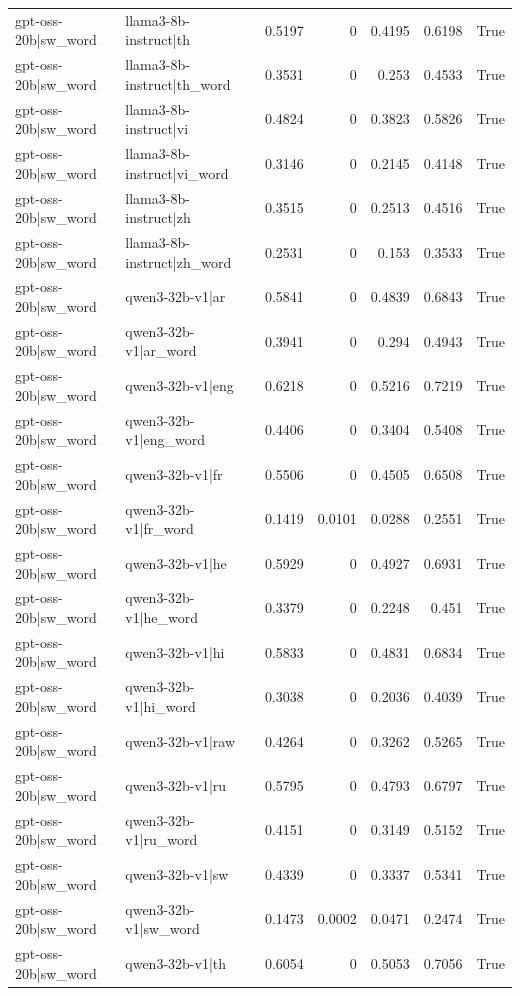 \begin{table}
\begin{tabular}{l l r r r r l}
gpt-oss-20b|sw_word & llama3-8b-instruct|th & 0.5197 & 0 & 0.4195 & 0.6198 & True \\
gpt-oss-20b|sw_word & llama3-8b-instruct|th_word & 0.3531 & 0 & 0.253 & 0.4533 & True \\
gpt-oss-20b|sw_word & llama3-8b-instruct|vi & 0.4824 & 0 & 0.3823 & 0.5826 & True \\
gpt-oss-20b|sw_word & llama3-8b-instruct|vi_word & 0.3146 & 0 & 0.2145 & 0.4148 & True \\
gpt-oss-20b|sw_word & llama3-8b-instruct|zh & 0.3515 & 0 & 0.2513 & 0.4516 & True \\
gpt-oss-20b|sw_word & llama3-8b-instruct|zh_word & 0.2531 & 0 & 0.153 & 0.3533 & True \\
gpt-oss-20b|sw_word & qwen3-32b-v1|ar & 0.5841 & 0 & 0.4839 & 0.6843 & True \\
gpt-oss-20b|sw_word & qwen3-32b-v1|ar_word & 0.3941 & 0 & 0.294 & 0.4943 & True \\
gpt-oss-20b|sw_word & qwen3-32b-v1|eng & 0.6218 & 0 & 0.5216 & 0.7219 & True \\
gpt-oss-20b|sw_word & qwen3-32b-v1|eng_word & 0.4406 & 0 & 0.3404 & 0.5408 & True \\
gpt-oss-20b|sw_word & qwen3-32b-v1|fr & 0.5506 & 0 & 0.4505 & 0.6508 & True \\
gpt-oss-20b|sw_word & qwen3-32b-v1|fr_word & 0.1419 & 0.0101 & 0.0288 & 0.2551 & True \\
gpt-oss-20b|sw_word & qwen3-32b-v1|he & 0.5929 & 0 & 0.4927 & 0.6931 & True \\
gpt-oss-20b|sw_word & qwen3-32b-v1|he_word & 0.3379 & 0 & 0.2248 & 0.451 & True \\
gpt-oss-20b|sw_word & qwen3-32b-v1|hi & 0.5833 & 0 & 0.4831 & 0.6834 & True \\
gpt-oss-20b|sw_word & qwen3-32b-v1|hi_word & 0.3038 & 0 & 0.2036 & 0.4039 & True \\
gpt-oss-20b|sw_word & qwen3-32b-v1|raw & 0.4264 & 0 & 0.3262 & 0.5265 & True \\
gpt-oss-20b|sw_word & qwen3-32b-v1|ru & 0.5795 & 0 & 0.4793 & 0.6797 & True \\
gpt-oss-20b|sw_word & qwen3-32b-v1|ru_word & 0.4151 & 0 & 0.3149 & 0.5152 & True \\
gpt-oss-20b|sw_word & qwen3-32b-v1|sw & 0.4339 & 0 & 0.3337 & 0.5341 & True \\
gpt-oss-20b|sw_word & qwen3-32b-v1|sw_word & 0.1473 & 0.0002 & 0.0471 & 0.2474 & True \\
gpt-oss-20b|sw_word & qwen3-32b-v1|th & 0.6054 & 0 & 0.5053 & 0.7056 & True \\

\end{tabular}
\end{table}
